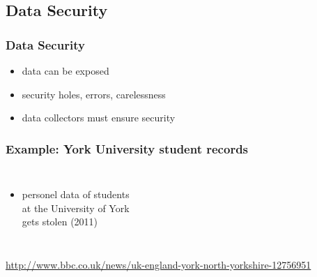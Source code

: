 \documentclass[dvipsnames]{beamer}
\theoremstyle{definition}
\theoremstyle{example}
\theoremstyle{plain}
\begin{document}
\subsection{Data Security}

\begin{frame}
  \frametitle{Data Security}

  \begin{itemize}
    \item data can be exposed
    \item security holes, errors, carelessness

    \bigskip
    \item data collectors must ensure security
  \end{itemize}
\end{frame}

\begin{frame}
  \frametitle{Example: York University student records}

  \begin{columns}

    \begin{itemize}
      \item personel data of students\\
        at the University of York\\
        gets stolen (2011)
    \end{itemize}
  \end{columns}

  \medskip
  \tiny{\url{http://www.bbc.co.uk/news/uk-england-york-north-yorkshire-12756951}}\\
\end{frame}
\end{document}
